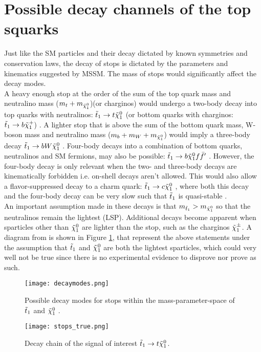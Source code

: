 \section{Possible decay channels of the top squarks} \label{sec:stopDecay}

Just like the SM particles and their decay dictated by known symmetries and conservation laws, the decay of stops is dictated by the parameters and kinematics suggested by MSSM. The mass of stops would significantly affect the decay modes. \\

A heavy enough stop at the order of the sum of the top quark mass and neutralino mass ($m_t+m_{\Tilde{\chi}_1^0}$)(or charginos) would undergo a two-body decay into top quarks with neutralinos: $\Tilde{t}_1\rightarrow t\Tilde{\chi}_1^0$ (or bottom quarks with charginos: $\Tilde{t}_1\rightarrow b\Tilde{\chi}_1^+$) \cite{boehm2000decays}. A lighter stop that is above the sum of the bottom quark mass, W-boson mass and neutralino mass ($m_b + m_W + m_{\Tilde{\chi}_1^0}$) would imply a three-body decay $\Tilde{t}_1\rightarrow b W \Tilde{\chi}_1^0$ \cite{aad2014search}. Four-body decays into a combination of bottom quarks, neutralinos and SM fermions, may also be possible: $\Tilde{t}_1\rightarrow b\Tilde{\chi}_1^0 f \Bar{f}'$ \cite{boehm2000decays}. However, the four-body decay is only relevant when the two- and three-body decays are kinematically forbidden i.e. on-shell decays aren't allowed. This would also allow a flavor-suppressed decay to a charm quark: $\Tilde{t}_1\rightarrow c\Tilde{\chi}_1^0$ \cite{aad2014search}, where both this decay and the four-body decay can be very slow such that $\Tilde{t}_1$ is quasi-stable \cite{martin1997supersymmetry}. \\

An important assumption made in these decays is that $m_{\Tilde{t}_1} > m_{\Tilde{\chi}_1^0} $ so that the neutralinos remain the lightest (LSP). Additional decays become apparent when sparticles other than $\Tilde{\chi}_1^0 $ are lighter than the stop, such as the charginos $\Tilde{\chi}_1^{\pm}$.
A diagram from \cite{aad2014search} is shown in Figure \ref{fig:decayMode}, that represent the above statements under the assumption that $\Tilde{t}_1 $ and $ \Tilde{\chi}_1^0 $ are both the lightest sparticles, which could very well not be true since there is no experimental evidence to disprove nor prove as such. 




\begin{figure}[htbp]
    \centering
    \texttt{[image: decaymodes.png]}
    \caption{Possible decay modes for stops within the mass-parameter-space of $\Tilde{t}_1 $ and $ \Tilde{\chi}_1^0 $ \cite{aad2014search}.}
    \label{fig:decayMode}
\end{figure}

\begin{figure}[htbp]
    \centering
    \texttt{[image: stops\_true.png]}
    \caption{Decay chain of the signal of interest $\Tilde{t}_1 \rightarrow t\Tilde{\chi}_1^0 $.}
    \label{fig:decayInterest}
\end{figure}